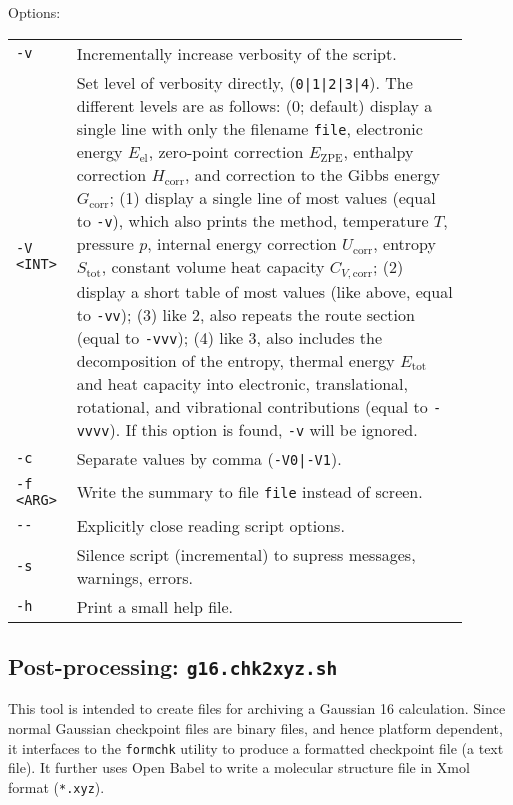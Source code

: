 \documentclass[   %
  final,          %
  a4paper         %
]{article}
\begin{document}
Options:

\begin{tabular}{p{0.1\linewidth}p{0.8\linewidth}}
  {\lstinline`-v`}       & Incrementally increase verbosity of the script. \\
  {\lstinline`-V <INT>`} & Set level of verbosity directly, ({\lstinline`0|1|2|3|4`}).
    The different levels are as follows: %
    (0; default) display a single line with only the filename {\lstinline`file`}, 
        electronic energy \(E_\mathrm{el}\), zero-point correction \(E_\mathrm{ZPE}\),
        enthalpy correction \(H_\mathrm{corr}\), 
        and correction to the Gibbs energy \(G_\mathrm{corr}\);
    (1) display a single line of most values (equal to {\lstinline`-v`}), 
        which also prints the method, temperature \(T\), pressure \(p\), 
        internal energy correction \(U_\mathrm{corr}\),
        entropy  \(S_\mathrm{tot}\), constant volume heat capacity \(C_{V,\mathrm{corr}}\);
    (2) display a short table of most values (like above, equal to {\lstinline`-vv`});
    (3) like 2, also repeats the route section (equal to {\lstinline`-vvv`});
    (4) like 3, also includes the decomposition of the entropy, 
        thermal energy \(E_\mathrm{tot}\) and heat capacity into electronic, translational,
        rotational, and vibrational contributions (equal to {\lstinline`-vvvv`}).
    If this option is found, {\lstinline`-v`} will be ignored. \\
  {\lstinline`-c`}       & Separate values by comma ({\lstinline`-V0|-V1`}). \\
  {\lstinline`-f <ARG>`} & Write the summary to file {\lstinline`file`} instead of screen. \\
  {\lstinline`--`}       & Explicitly close reading script options. \\
  {\lstinline`-s`}       & Silence script (incremental) to supress messages, warnings, errors. \\
  {\lstinline`-h`}       & Print a small help file. \\
\end{tabular}

\subsection{Post-processing: \texorpdfstring{{\lstinline`g16.chk2xyz.sh`}}{g16.chk2xyz.sh}}

This tool is intended to create files for archiving a Gaussian 16 calculation.
Since normal Gaussian checkpoint files are binary files, and hence platform dependent,
it interfaces to the \texttt{formchk} utility to produce a formatted checkpoint file (a text file).
It further uses Open Babel to write a molecular structure file in Xmol format (\texttt{*.xyz}).
\end{document}
